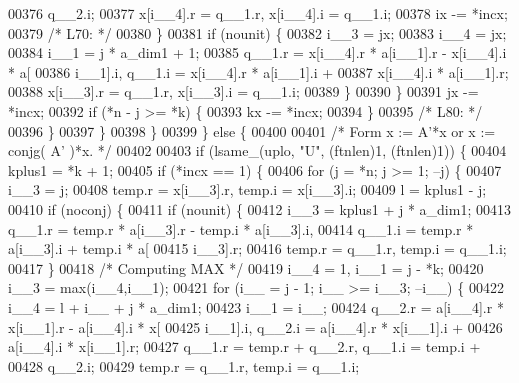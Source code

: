 \begin{DoxyCode}
00376                     q\_\_2.i;
00377                 x[i\_\_4].r = q\_\_1.r, x[i\_\_4].i = q\_\_1.i;
00378                 ix -= *incx;
00379 \textcolor{comment}{/* L70: */}
00380             \}
00381             \textcolor{keywordflow}{if} (nounit) \{
00382                 i\_\_3 = jx;
00383                 i\_\_4 = jx;
00384                 i\_\_1 = j * a\_dim1 + 1;
00385                 q\_\_1.r = x[i\_\_4].r * a[i\_\_1].r - x[i\_\_4].i * a[
00386                     i\_\_1].i, q\_\_1.i = x[i\_\_4].r * a[i\_\_1].i + 
00387                     x[i\_\_4].i * a[i\_\_1].r;
00388                 x[i\_\_3].r = q\_\_1.r, x[i\_\_3].i = q\_\_1.i;
00389             \}
00390             \}
00391             jx -= *incx;
00392             \textcolor{keywordflow}{if} (*n - j >= *k) \{
00393             kx -= *incx;
00394             \}
00395 \textcolor{comment}{/* L80: */}
00396         \}
00397         \}
00398     \}
00399     \} \textcolor{keywordflow}{else} \{
00400 
00401 \textcolor{comment}{/*        Form  x := A'*x  or  x := conjg( A' )*x. */}
00402 
00403     \textcolor{keywordflow}{if} (lsame\_(uplo, \textcolor{stringliteral}{"U"}, (ftnlen)1, (ftnlen)1)) \{
00404         kplus1 = *k + 1;
00405         \textcolor{keywordflow}{if} (*incx == 1) \{
00406         \textcolor{keywordflow}{for} (j = *n; j >= 1; --j) \{
00407             i\_\_3 = j;
00408             temp.r = x[i\_\_3].r, temp.i = x[i\_\_3].i;
00409             l = kplus1 - j;
00410             \textcolor{keywordflow}{if} (noconj) \{
00411             \textcolor{keywordflow}{if} (nounit) \{
00412                 i\_\_3 = kplus1 + j * a\_dim1;
00413                 q\_\_1.r = temp.r * a[i\_\_3].r - temp.i * a[i\_\_3].i, 
00414                     q\_\_1.i = temp.r * a[i\_\_3].i + temp.i * a[
00415                     i\_\_3].r;
00416                 temp.r = q\_\_1.r, temp.i = q\_\_1.i;
00417             \}
00418 \textcolor{comment}{/* Computing MAX */}
00419             i\_\_4 = 1, i\_\_1 = j - *k;
00420             i\_\_3 = max(i\_\_4,i\_\_1);
00421             \textcolor{keywordflow}{for} (i\_\_ = j - 1; i\_\_ >= i\_\_3; --i\_\_) \{
00422                 i\_\_4 = l + i\_\_ + j * a\_dim1;
00423                 i\_\_1 = i\_\_;
00424                 q\_\_2.r = a[i\_\_4].r * x[i\_\_1].r - a[i\_\_4].i * x[
00425                     i\_\_1].i, q\_\_2.i = a[i\_\_4].r * x[i\_\_1].i + 
00426                     a[i\_\_4].i * x[i\_\_1].r;
00427                 q\_\_1.r = temp.r + q\_\_2.r, q\_\_1.i = temp.i + 
00428                     q\_\_2.i;
00429                 temp.r = q\_\_1.r, temp.i = q\_\_1.i;

\end{DoxyCode}
